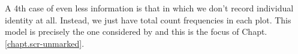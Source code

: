 A 4th case of even less information is that in which
we don't record individual identity at all. Instead,
we just have total count frequencies in each plot.
This model is precisely the one considered by
\citep{chandler_royle:2012} and this is the focus of
Chapt. \ref{chapt.scr-unmarked}.

